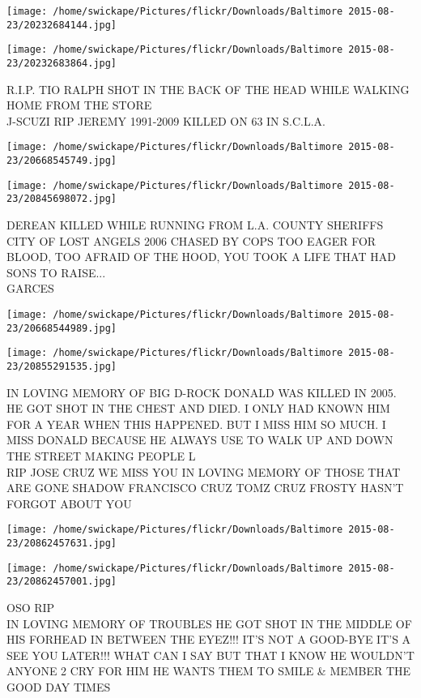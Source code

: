 \documentclass[10pt,letterpaper]{article}
\begin{document}
\texttt{[image: /home/swickape/Pictures/flickr/Downloads/Baltimore 2015-08-23/20232684144.jpg]}

\vspace{0.25in}
\texttt{[image: /home/swickape/Pictures/flickr/Downloads/Baltimore 2015-08-23/20232683864.jpg]}

R.I.P. TIO RALPH SHOT IN THE BACK OF THE HEAD WHILE WALKING HOME FROM THE STORE\\
J{-}SCUZI RIP JEREMY 1991{-}2009 KILLED ON 63 IN S.C.L.A.
\pagebreak

\texttt{[image: /home/swickape/Pictures/flickr/Downloads/Baltimore 2015-08-23/20668545749.jpg]}

\vspace{0.25in}
\texttt{[image: /home/swickape/Pictures/flickr/Downloads/Baltimore 2015-08-23/20845698072.jpg]}

DEREAN KILLED WHILE RUNNING FROM L.A. COUNTY SHERIFFS CITY OF LOST ANGELS 2006 CHASED BY COPS TOO EAGER FOR BLOOD, TOO AFRAID OF THE HOOD, YOU TOOK A LIFE THAT HAD SONS TO RAISE...\\
GARCES
\pagebreak

\texttt{[image: /home/swickape/Pictures/flickr/Downloads/Baltimore 2015-08-23/20668544989.jpg]}

\vspace{0.25in}
\texttt{[image: /home/swickape/Pictures/flickr/Downloads/Baltimore 2015-08-23/20855291535.jpg]}

IN LOVING MEMORY OF BIG D{-}ROCK DONALD WAS KILLED IN 2005.  HE GOT SHOT IN THE CHEST AND DIED.  I ONLY HAD KNOWN HIM FOR A YEAR WHEN THIS HAPPENED.  BUT I MISS HIM SO MUCH.  I MISS DONALD BECAUSE HE ALWAYS USE TO WALK UP AND DOWN THE STREET MAKING PEOPLE L\\
RIP JOSE CRUZ WE MISS YOU IN LOVING MEMORY OF THOSE THAT ARE GONE SHADOW FRANCISCO CRUZ TOMZ CRUZ FROSTY HASN'T FORGOT ABOUT YOU
\pagebreak

\texttt{[image: /home/swickape/Pictures/flickr/Downloads/Baltimore 2015-08-23/20862457631.jpg]}

\vspace{0.25in}
\texttt{[image: /home/swickape/Pictures/flickr/Downloads/Baltimore 2015-08-23/20862457001.jpg]}

OSO RIP\\
IN LOVING MEMORY OF TROUBLES HE GOT SHOT IN THE MIDDLE OF HIS FORHEAD IN BETWEEN THE EYEZ!!! IT'S NOT A GOOD{-}BYE IT'S A SEE YOU LATER!!! WHAT CAN I SAY BUT THAT I KNOW HE WOULDN'T ANYONE 2 CRY FOR HIM HE WANTS THEM TO SMILE \& MEMBER THE GOOD DAY TIMES
\pagebreak
\end{document}
